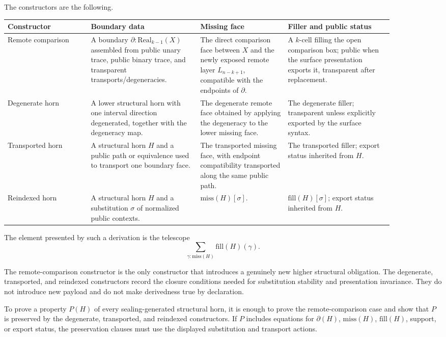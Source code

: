 \documentclass{lmcs}
\begin{document}
\begin{defi}
The constructors are the following.
\begin{center}
\small
\setlength{\tabcolsep}{3pt}
\begin{tabular}{p{0.19\linewidth}p{0.25\linewidth}p{0.20\linewidth}p{0.24\linewidth}}
\hline
Constructor & Boundary data & Missing face & Filler and public status \\
\hline
Remote comparison
& A boundary \(\partial:\mathrm{Real}_{k-1}(X)\) assembled from public unary trace, public
binary trace, and transparent transports/degeneracies.
& The direct comparison face between \(X\) and the newly exposed remote layer
\(L_{n-k+1}\), compatible with the endpoints of \(\partial\).
& A \(k\)-cell filling the open comparison box; public when the surface presentation exports
it, transparent after replacement. \\
\hline
Degenerate horn
& A lower structural horn with one interval direction degenerated, together with the
degeneracy map.
& The degenerate remote face obtained by applying the degeneracy to the lower missing face.
& The degenerate filler; transparent unless explicitly exported by the surface syntax. \\
\hline
Transported horn
& A structural horn \(H\) and a public path or equivalence used to transport one boundary
face.
& The transported missing face, with endpoint compatibility transported along the same
public path.
& The transported filler; export status inherited from \(H\). \\
\hline
Reindexed horn
& A structural horn \(H\) and a substitution \(\sigma\) of normalized public contexts.
& \(\mathrm{miss}(H)[\sigma]\).
& \(\mathrm{fill}(H)[\sigma]\); export status inherited from \(H\). \\
\hline
\end{tabular}
\end{center}
The element presented by such a derivation is the telescope
\[
  \sum_{\gamma:\mathrm{miss}(H)} \mathrm{fill}(H)(\gamma).
\]
\end{defi}

The remote-comparison constructor is the only constructor that introduces a genuinely new
higher structural obligation.  The degenerate, transported, and reindexed constructors record
the closure conditions needed for substitution stability and presentation invariance.  They do
not introduce new payload and do not make derivedness true by declaration.

\begin{prop}
\label{prop:structural-horn-induction}
To prove a property \(P(H)\) of every sealing-generated structural horn, it is enough to prove
the remote-comparison case and show that \(P\) is preserved by the degenerate, transported,
and reindexed constructors.  If \(P\) includes equations for
\(\partial(H)\), \(\mathrm{miss}(H)\), \(\mathrm{fill}(H)\), support, or export status, the
preservation clauses must use the displayed substitution and transport actions.
\end{prop}
\end{document}
